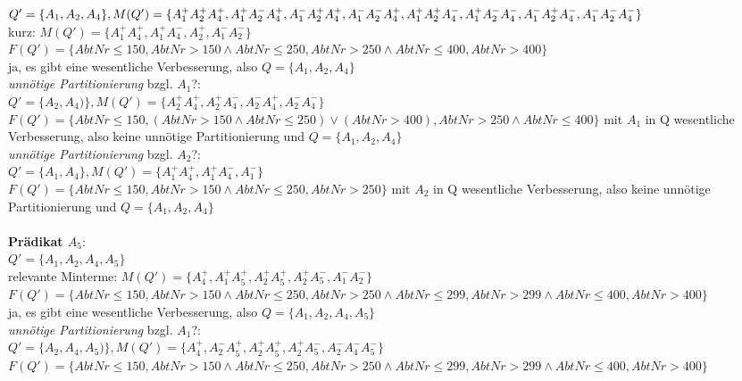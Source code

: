 \documentclass[a4paper]{article}
\begin{document}
$ Q' = \{ A_1, A_2, A_4 \}, \\
M(Q') = \{ A_1^+ A_2^+ A_4^+, A_1^+ A_2^- A_4^+, A_1^- A_2^+ A_4^+, A_1^- A_2^- A_4^+, A_1^+ A_2^+ A_4^-, A_1^+ A_2^- A_4^-, A_1^- A_2^+ A_4^-, A_1^- A_2^- A_4^-\} $\\
kurz: $ M(Q') = \{ A_1^+ A_4^+, A_1^+ A_4^-, A_2^+, A_1^- A_2^-\} $\\
$ F(Q') = \{ AbtNr\leq 150, AbtNr >150 \wedge AbtNr \leq 250, AbtNr>250 \wedge AbtNr \leq 400, AbtNr > 400 \} $\\
ja, es gibt eine wesentliche Verbesserung, also $ Q = \{ A_1, A_2, A_4 \} $ \\
\textit{unnötige Partitionierung} bzgl. $ A_1 $?: \\
$ Q' = \{A_2, A_4) \}, M(Q') = \{ A_2^+ A_4^+, A_2^+ A_4^-, A_2^- A_4^+, A_2^- A_4^- \} $\\
$ F(Q') = \{ AbtNr\leq 150, (AbtNr >150 \wedge AbtNr \leq 250) \vee (AbtNr > 400), AbtNr>250 \wedge AbtNr \leq 400 \} $
mit $ A_1 $ in Q wesentliche Verbesserung, also keine unnötige Partitionierung und $ Q = \{ A_1, A_2, A_4 \} $\\
\textit{unnötige Partitionierung} bzgl. $ A_2 $?: \\
$ Q' = \{A_1, A_4 \}, M(Q') = \{ A_1^+ A_4^+, A_1^+ A_4^-, A_1^-\} $\\
$ F(Q') = \{ AbtNr\leq 150, AbtNr >150 \wedge AbtNr \leq 250, AbtNr >250 \} $
mit $ A_2 $ in Q wesentliche Verbesserung, also keine unnötige Partitionierung und $ Q = \{ A_1, A_2, A_4 \} $\\
\\
\textbf{Prädikat $ A_5 $}:\\
$ Q' = \{ A_1, A_2, A_4, A_5 \} $\\
relevante Minterme: $ M(Q') = \{ A_4^+, A_1^+ A_5^+, A_2^+ A_5^+, A_2^+ A_5^-, A_1^- A_2^- \} $\\
$ F(Q') = \{ AbtNr\leq 150, AbtNr >150 \wedge AbtNr \leq 250, AbtNr>250 \wedge AbtNr \leq 299, AbtNr >299 \wedge AbtNr \leq 400, AbtNr > 400 \} $\\
ja, es gibt eine wesentliche Verbesserung, also $ Q = \{ A_1, A_2, A_4, A_5 \} $ \\
\textit{unnötige Partitionierung} bzgl. $ A_1 $?: \\
$ Q' = \{A_2, A_4, A_5) \}, M(Q') = \{ A_4^+, A_2^- A_5^+, A_2^+ A_5^+, A_2^+ A_5^-, A_2^- A_4^- A_5^- \} $\\
$ F(Q') = \{ AbtNr\leq 150, AbtNr >150 \wedge AbtNr \leq 250, AbtNr>250 \wedge AbtNr \leq 299, AbtNr >299 \wedge AbtNr \leq 400, AbtNr > 400 \} $
\end{document}
